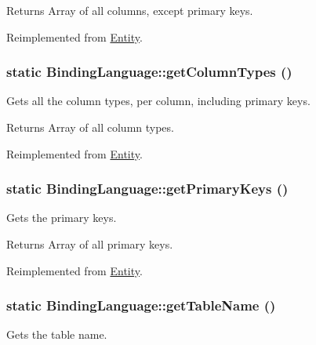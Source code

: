 \begin{DoxyReturn}{Returns}
Array of all columns, except primary keys. 
\end{DoxyReturn}


Reimplemented from \hyperlink{classEntity_a394717a08ffd54ec9a14d06727c86719}{Entity}.

\hypertarget{classBindingLanguage_a2555fe5224b885813f810b249a0fbefb}{
\subsubsection[{getColumnTypes}]{\setlength{\rightskip}{0pt plus 5cm}static BindingLanguage::getColumnTypes ()}}
\label{classBindingLanguage_a2555fe5224b885813f810b249a0fbefb}
Gets all the column types, per column, including primary keys.

\begin{DoxyReturn}{Returns}
Array of all column types. 
\end{DoxyReturn}


Reimplemented from \hyperlink{classEntity_ad69437219c10955803707fbf6ac458e7}{Entity}.

\hypertarget{classBindingLanguage_aafc27da4c3edcd204cf51d2d2429e8eb}{
\subsubsection[{getPrimaryKeys}]{\setlength{\rightskip}{0pt plus 5cm}static BindingLanguage::getPrimaryKeys ()}}
\label{classBindingLanguage_aafc27da4c3edcd204cf51d2d2429e8eb}
Gets the primary keys.

\begin{DoxyReturn}{Returns}
Array of all primary keys. 
\end{DoxyReturn}


Reimplemented from \hyperlink{classEntity_a61bbfbb4058427174e002a09ddc77c41}{Entity}.

\hypertarget{classBindingLanguage_a0f5427a1846d14c04dee6c35c73a0781}{
\subsubsection[{getTableName}]{\setlength{\rightskip}{0pt plus 5cm}static BindingLanguage::getTableName ()}}
\label{classBindingLanguage_a0f5427a1846d14c04dee6c35c73a0781}
Gets the table name.


